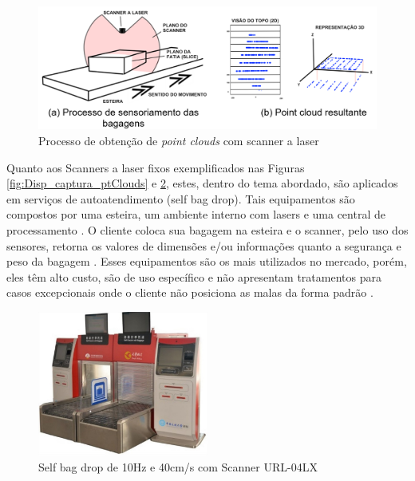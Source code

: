         \begin{figure}[h]
           \centering
           \includegraphics[width=1\textwidth]{imagens/Processo_Obtencao_pointCloud_com_scanner_laser.png} 
           \caption{Processo de obtenção de \textit{point clouds} com scanner a laser}
           \label{fig:Process_obterPtcloud_scanner}
        \end{figure}

    Quanto aos Scanners a laser fixos exemplificados nas Figuras \ref{fig:Disp_captura_ptClouds} e \ref{fig:sefl-bag-drop-URL_Disp}, estes, dentro do tema abordado, são aplicados em serviços de autoatendimento (self bag drop). Tais equipamentos são compostos por uma esteira, um ambiente interno com lasers e uma central de processamento \cite{qingji_2018_method}. O cliente coloca sua bagagem na esteira e o scanner, pelo uso dos sensores, retorna os valores de dimensões e/ou informações quanto a segurança e peso da bagagem \cite{gao_2018_minimum}. Esses equipamentos são os mais utilizados no mercado, porém, eles têm alto custo, são de uso específico e não apresentam tratamentos para casos excepcionais onde o cliente não posiciona as malas da forma padrão \cite{ren_2020_a, gao_2021_airline, qingji_2018_method}.

        \begin{figure}[h]
           \centering
           \includegraphics[width=0.5\textwidth]{imagens/self_bag_drop_10hz_40cm_s_URL_04LX.png} 
           \caption{Self bag drop de 10Hz e 40cm/s com Scanner URL-04LX \cite{gao_2018_minimum}}
           \label{fig:sefl-bag-drop-URL_Disp}
        \end{figure}

